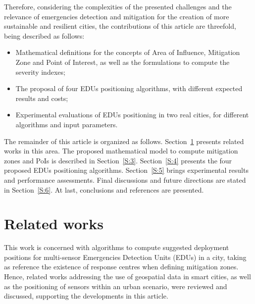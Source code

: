 \begin{refsection}
Therefore, considering the complexities of the presented challenges and the relevance of emergencies detection and mitigation for the creation of more sustainable and resilient cities, the contributions of this article are threefold, being described as follows:

\begin{itemize}
  \item Mathematical definitions for the concepts of Area of Influence, Mitigation Zone and Point of Interest, as well as the formulations to compute the severity indexes;
  \item The proposal of four EDUs positioning algorithms, with different expected results and costs;
  \item Experimental evaluations of EDUs positioning in two real cities, for different algorithms and input parameters.
\end{itemize}

The remainder of this article is organized as follows. Section~\ref{S:2} presents related works in this area. The proposed mathematical model to compute mitigation zones and PoIs is described in Section~\ref{S:3}. Section~\ref{S:4} presents the four proposed EDUs positioning algorithms. Section~\ref{S:5} brings experimental results and performance assessments. Final discussions and future directions are stated in Section~\ref{S:6}. At last, conclusions and references are presented.

\section{Related works}\label{S:2}

This work is concerned with algorithms to compute suggested deployment positions for multi-sensor Emergencies Detection Units (EDUs) in a city, taking as reference the existence of response centres when defining mitigation zones. Hence, related works addressing the use of geospatial data in smart cities, as well as the positioning of sensors within an urban scenario, were reviewed and discussed, supporting the developments in this article.


\end{refsection}
